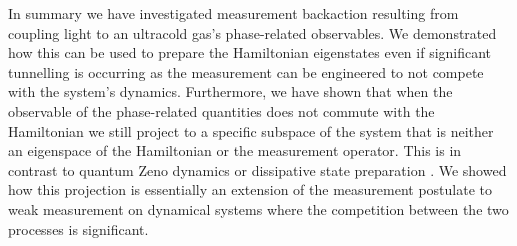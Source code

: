 In summary we have investigated measurement backaction resulting from
coupling light to an ultracold gas's phase-related observables. We
demonstrated how this can be used to prepare the Hamiltonian
eigenstates even if significant tunnelling is occurring as the
measurement can be engineered to not compete with the system's
dynamics. Furthermore, we have shown that when the observable of the
phase-related quantities does not commute with the Hamiltonian we
still project to a specific subspace of the system that is neither an
eigenspace of the Hamiltonian or the measurement operator. This is in
contrast to quantum Zeno dynamics \cite{misra1977, facchi2008,
  raimond2010, raimond2012, signoles2014} or dissipative state
preparation \cite{diehl2008}. We showed how this projection is
essentially an extension of the measurement postulate to weak
measurement on dynamical systems where the competition between the two
processes is significant.

